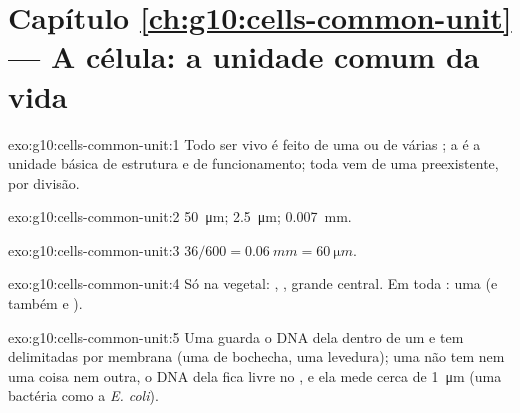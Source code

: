 \section*{Capítulo \ref{ch:g10:cells-common-unit} --- A célula: a unidade comum da vida}

\begin{solution}{exo:g10:cells-common-unit:1}
Todo ser vivo é feito de uma ou de várias ; a  é a unidade
básica de estrutura e de funcionamento; toda  vem de uma 
preexistente, por divisão.
\end{solution}

\begin{solution}{exo:g10:cells-common-unit:2}
\qty{50}{\micro m}; \qty{2.5}{\micro m}; \qty{0.007}{mm}.
\end{solution}

\begin{solution}{exo:g10:cells-common-unit:3}
$36/600 = \qty{0.06}{mm} = \qty{60}{\micro m}$.
\end{solution}

\begin{solution}{exo:g10:cells-common-unit:4}
Só na vegetal: , , grande  central. Em
toda : uma  (e também  e ).
\end{solution}

\begin{solution}{exo:g10:cells-common-unit:5}
Uma  guarda o DNA dela dentro de um  e tem
 delimitadas por membrana (uma  de bochecha, uma
levedura); uma  não tem nem uma coisa nem outra, o
DNA dela fica livre no , e ela mede cerca de
\qty{1}{\micro m} (uma bactéria como a \emph{E. coli}).
\end{solution}

